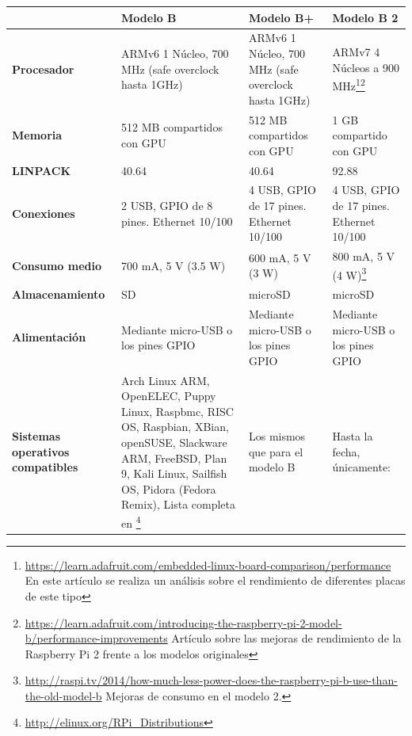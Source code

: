 \begin{landscape}
\begin{table}[h]
\begin{tabular}{|p{3.2cm}|p{6cm}|p{6cm}|p{6cm}|}
\hline
 & \textbf{Modelo B} & \textbf{Modelo B+} & \textbf{Modelo B 2}\\ \hline
\textbf{Procesador} & ARMv6 1 Núcleo, 700 MHz (safe overclock hasta 1GHz) & ARMv6 1 Núcleo, 700 MHz (safe overclock hasta 1GHz) & ARMv7 4 Núcleos a 900 MHz\footnote{\href{https://learn.adafruit.com/embedded-linux-board-comparison/performance}{https://learn.adafruit.com/embedded-linux-board-comparison/performance} En este artículo se realiza un análisis sobre el rendimiento de diferentes placas de este tipo}\footnote{\href{https://learn.adafruit.com/introducing-the-raspberry-pi-2-model-b/performance-improvements}{https://learn.adafruit.com/introducing-the-raspberry-pi-2-model-b/performance-improvements} Artículo sobre las mejoras de rendimiento de la Raspberry Pi 2 frente a los modelos originales} \\ \hline
\textbf{Memoria} & 512 MB compartidos con GPU & 512 MB compartidos con GPU & 1 GB compartido con GPU\\ \hline
\textbf{LINPACK} \cite{hackaday:benchmarkpi2,gist:linpackbenchmark,elinux:benchmark} & 40.64 & 40.64 & 92.88\\ \hline
\textbf{Conexiones} & 2 USB, GPIO de 8 pines. Ethernet 10/100 & 4 USB, GPIO de 17 pines. Ethernet 10/100 & 4 USB, GPIO de 17 pines. Ethernet 10/100\\ \hline
\textbf{Consumo medio} & 700 mA, 5 V (3.5 W) & 600 mA, 5 V (3 W) & 800 mA, 5 V (4 W)\footnote{\href{http://raspi.tv/2014/how-much-less-power-does-the-raspberry-pi-b-use-than-the-old-model-b}{http://raspi.tv/2014/how-much-less-power-does-the-raspberry-pi-b-use-than-the-old-model-b} Mejoras de consumo en el modelo 2.}\\ \hline
\textbf{Almacenamiento} & SD & microSD & microSD\\ \hline
\textbf{Alimentación} & Mediante micro-USB o los pines GPIO & Mediante micro-USB o los pines GPIO &Mediante micro-USB o los pines GPIO\\ \hline
\textbf{Sistemas operativos compatibles} & 

Arch Linux ARM, OpenELEC, Puppy Linux, Raspbmc, RISC OS, Raspbian, XBian, openSUSE, Slackware ARM, FreeBSD, Plan 9, Kali Linux, Sailfish OS, Pidora (Fedora Remix), Lista completa en \footnote{\href{http://elinux.org/RPi\_Distributions}{http://elinux.org/RPi\_Distributions}} & Los mismos que para el modelo B & Hasta la fecha, únicamente:


\end{tabular}
\end{table}
\end{landscape}
